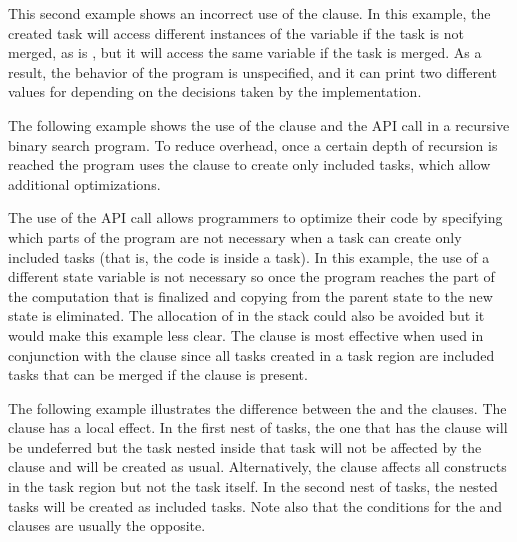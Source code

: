 

This second example shows an incorrect use of the  clause. In 
this example, the created task will access different instances of the variable 
 if the task is not merged, as  is , but 
it will access the same variable  if the task is merged. As a result, 
the behavior of the program is unspecified, and it can print two different values 
for  depending on the decisions taken by the implementation.



The following example shows the use of the  clause and the  
API call in a recursive binary search program. To reduce overhead, once a certain 
depth of recursion is reached the program uses the  clause to create 
only included tasks, which allow additional optimizations.

The use of the  API call allows programmers to optimize 
their code by specifying which parts of the program are not necessary when a task 
can create only included tasks (that is, the code is inside a  task). 
In this example, the use of a different state variable is not necessary so once 
the program reaches the part of the computation that is finalized and copying from 
the parent state to the new state is eliminated. The allocation of  
in the stack could also be avoided but it would make this example less clear. The 
 clause is most effective when used in conjunction with the  
clause since all tasks created in a  task region are included tasks 
that can be merged if the  clause is present.



The following example illustrates the difference between the   and the 
 clauses. The  clause has a local effect. In the first 
nest of tasks, the one that has the   clause will be undeferred but 
the task nested inside that task will not be affected by the  clause 
and will be created as usual. Alternatively, the  clause affects 
all  constructs in the  task region but not the  
task itself. In the second nest of tasks, the nested tasks will be created as included 
tasks. Note also that the conditions for the  and  clauses 
are usually the opposite.




